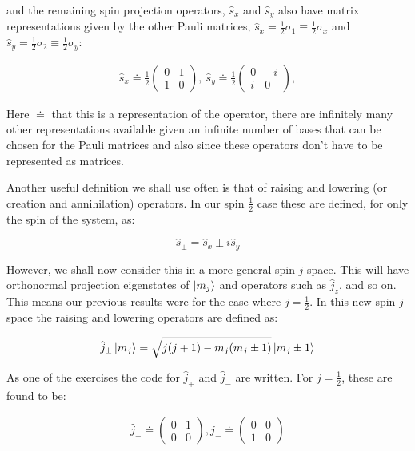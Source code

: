 \documentclass[11pt,a4paper]{article}
\begin{document}
\noindent and the remaining spin projection operators, $\hat{s}_x$ and $\hat{s}_y$ also have matrix representations given by the other Pauli matrices, $\hat{s}_x = \frac{1}{2}\sigma_1 \equiv \frac{1}{2}\sigma_x$ and $\hat{s}_y = \frac{1}{2}\sigma_2 \equiv \frac{1}{2}\sigma_y$:

\begin{gather}
    \hat{s}_x \doteq \frac{1}{2}
    \begin{pmatrix}
        0 & 1 \\ 1 & 0
    \end{pmatrix}
    , ~\hat{s}_y \doteq \frac{1}{2}
    \begin{pmatrix}
        0 & -i \\ i & 0
    \end{pmatrix}
    ,
    \label{MatrixRepresentationSxSy}
\end{gather}

\noindent Here $\doteq$ that this is a representation of the operator, there are infinitely many other representations available given an infinite number of bases that can be chosen for the Pauli matrices and also since these operators don't have to be represented as matrices.

\noindent Another useful definition we shall use often is that of raising and lowering (or creation and annihilation) operators. In our spin $\frac{1}{2}$ case these are defined, for only the spin of the system, as:

\begin{equation}
    \hat{s}_{\pm} = \hat{s}_x \pm i \hat{s}_y
    \label{Spin1/2RaisingLoweringOperators}
\end{equation}

\noindent However, we shall now consider this in a more general spin $j$ space. This will have orthonormal projection eigenstates of $\ket{m_j}$ and operators such as $\hat{j}_z$, and so on. This means our previous results were for the case where $j = \frac{1}{2}$. In this new spin $j$ space the raising and lowering operators are defined as:

\begin{equation}
    \hat{j}_{\pm} \ket{m_j} = \sqrt{j(j + 1) - m_j (m_j \pm 1)} \ket{m_j \pm 1}
    \label{Spin_j_RaisingLoweringOperators}
\end{equation}

\noindent As one of the exercises the code for $\hat{j}_+$ and $\hat{j}_-$ are written. For $j = \frac{1}{2}$, these are found to be:

\begin{gather}
    \hat{j}_+ \doteq
    \begin{pmatrix}
        0 & 1 \\ 0 & 0
    \end{pmatrix}
    , \hat{j}_- \doteq
    \begin{pmatrix}
        0 & 0 \\ 1 & 0
    \end{pmatrix}
    \label{RaisingLoweringOperatorsSpin1/2}
\end{gather}
\end{document}

